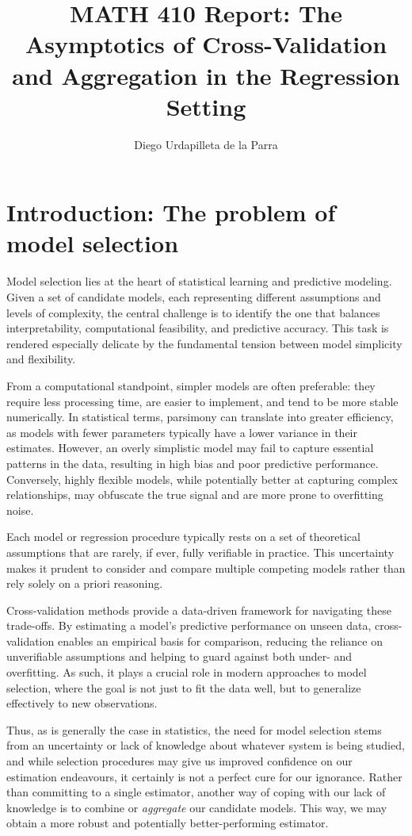\documentclass[11pt, letter paper]{article}
\title{MATH 410 Report: The Asymptotics of Cross-Validation and Aggregation in the Regression Setting}
\author{Diego Urdapilleta de la Parra}
\newcommand{\1}{\mathmybb{1}}
\newcommand{\0}{\emptyset}
\begin{document}
\maketitle
\tableofcontents

\newpage
\section{Introduction: The problem of model selection}

Model selection lies at the heart of statistical learning and predictive modeling. Given a set of candidate models, each representing different assumptions and levels of complexity, the central challenge is to identify the one that balances interpretability, computational feasibility, and predictive accuracy. This task is rendered especially delicate by the fundamental tension between model simplicity and flexibility.

From a computational standpoint, simpler models are often preferable: they require less processing time, are easier to implement, and tend to be more stable numerically. In statistical terms, parsimony can translate into greater efficiency, as models with fewer parameters typically have a lower variance in their estimates. However, an overly simplistic model may fail to capture essential patterns in the data, resulting in high bias and poor predictive performance. Conversely, highly flexible models, while potentially better at capturing complex relationships, may obfuscate the true signal and are more prone to overfitting noise.

Each model or regression procedure typically rests on a set of theoretical assumptions that are rarely, if ever, fully verifiable in practice. This uncertainty makes it prudent to consider and compare multiple competing models rather than rely solely on a priori reasoning.

Cross-validation methods provide a data-driven framework for navigating these trade-offs. By estimating a model's predictive performance on unseen data, cross-validation enables an empirical basis for comparison, reducing the reliance on unverifiable assumptions and helping to guard against both under- and overfitting. As such, it plays a crucial role in modern approaches to model selection, where the goal is not just to fit the data well, but to generalize effectively to new observations.

Thus, as is generally the case in statistics, the need for model selection stems from an uncertainty or lack of knowledge about whatever system is being studied, and while selection procedures may give us improved confidence on our estimation endeavours, it certainly is not a perfect cure for our ignorance. Rather than committing to a single estimator, another way of coping with our lack of knowledge is to combine or \emph{aggregate} our candidate models. This way, we may obtain a more robust and potentially better-performing estimator.
\end{document}

